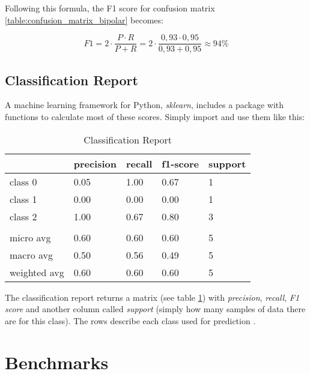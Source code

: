 Following this formula, the F1 score for confusion matrix \ref{table:confusion_matrix_bipolar} becomes:

\[
  F1 = 2 \cdot \frac{P \cdot R}{P + R} = 2 \cdot \frac{0,93 \cdot 0,95}{0,93 + 0,95} \approx 94\%
\]

\subsection{Classification Report}

A machine learning framework for Python, \textit{sklearn}, includes a package with functions to calculate most of these scores. 
Simply import and use them like this: 



\begin{table}
  \begin{tabular}{| l | l | l | l | l |}
    \hline
                  & precision & recall  & f1-score & support \\ \hline
    class 0       & 0.05      & 1.00    & 0.67    & 1        \\
    class 1       & 0.00      & 0.00    & 0.00    & 1        \\
    class 2       & 1.00      & 0.67    & 0.80    & 3        \\
                  &           &         &         &          \\ 
    micro avg     & 0.60      & 0.60    & 0.60    & 5        \\
    macro avg     & 0.50      & 0.56    & 0.49    & 5        \\
    weighted avg  & 0.60      & 0.60    & 0.60    & 5        \\
    \hline
  \end{tabular}
  \caption{Classification Report}
  \label{table:classification_report}
\end{table}

The classification report returns a matrix (see table \ref{table:classification_report}) with \textit{precision}, 
\textit{recall}, \textit{F1 score} and another column called \textit{support} (simply how many samples of data there are for this class). 
The rows describe each class used for prediction \cite{sklearn_classification_report}.

\section{Benchmarks}
 